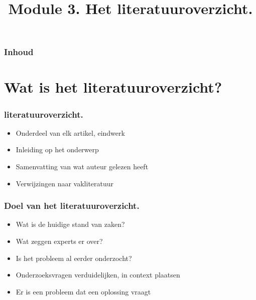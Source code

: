 \documentclass[aspectratio=169]{beamer}
\title{Module 3. Het literatuuroverzicht.}
\subtitle{\coursename}
\author{\lecturers}   %
\date{\academicyear}
\begin{document}
\begin{frame}
  \maketitle
\end{frame}

\begin{frame}
  \frametitle{Inhoud}

  \tableofcontents
\end{frame}


\section{Wat is het literatuuroverzicht?}

\begin{frame}
  \frametitle{literatuuroverzicht.}

  \begin{itemize}
    \item Onderdeel van elk artikel, eindwerk
    \item Inleiding op het onderwerp
    \item Samenvatting van wat auteur gelezen heeft
    \item Verwijzingen naar vakliteratuur
  \end{itemize}

  \bigskip

\end{frame}

\begin{frame}
  \frametitle{Doel van het literatuuroverzicht.}

  \begin{itemize}
    \item Wat is de huidige stand van zaken?
    \item Wat zeggen experts er over?
    \item Is het probleem al eerder onderzocht?
    \item Onderzoeksvragen verduidelijken, in context plaatsen
    \item Er is een probleem dat een oplossing vraagt
  \end{itemize}

  \bigskip

\end{frame}
\end{document}
